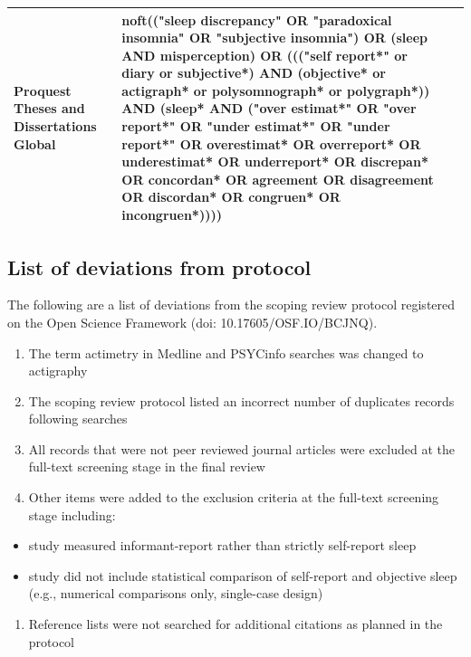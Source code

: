 \documentclass[
]{article}
\providecommand{\tightlist}{%
  \setlength{\itemsep}{0pt}\setlength{\parskip}{0pt}}
\begin{document}
\begin{table}[!h]
\begin{tabular}[t]{>{\raggedright\arraybackslash}p{7em}>{\raggedright\arraybackslash}p{40em}>{\raggedleft\arraybackslash}p{4em}}
Proquest Theses and Dissertations Global & noft(("sleep discrepancy" OR "paradoxical insomnia" OR "subjective insomnia") OR (sleep AND misperception) OR
((("self report*" or diary or subjective*) AND (objective* or actigraph* or polysomnograph* or polygraph*))
AND (sleep* AND ("over estimat*" OR "over report*" OR "under estimat*" OR "under report*" OR overestimat* OR overreport* OR underestimat* OR underreport*
OR discrepan* OR concordan* OR agreement OR disagreement OR discordan* OR congruen* OR incongruen*)))) & 90\\
\bottomrule
\end{tabular}
\end{table}

\newpage

\subsection{List of deviations from protocol}\label{deviations}

The following are a list of deviations from the scoping review protocol registered on the Open Science Framework (doi: 10.17605/OSF.IO/BCJNQ).

\begin{enumerate}
\def\labelenumi{\arabic{enumi}.}
\tightlist
\item
  The term actimetry in Medline and PSYCinfo searches was changed to actigraphy
\item
  The scoping review protocol listed an incorrect number of duplicates records following searches
\item
  All records that were not peer reviewed journal articles were excluded at the full-text screening stage in the final review
\item
  Other items were added to the exclusion criteria at the full-text screening stage including:
\end{enumerate}

\begin{itemize}
\tightlist
\item
  study measured informant-report rather than strictly self-report sleep
\item
  study did not include statistical comparison of self-report and objective sleep (e.g., numerical comparisons only, single-case design)
\end{itemize}

\begin{enumerate}
\def\labelenumi{\arabic{enumi}.}
\setcounter{enumi}{4}
\tightlist
\item
  Reference lists were not searched for additional citations as planned in the protocol
\end{enumerate}
\end{document}
